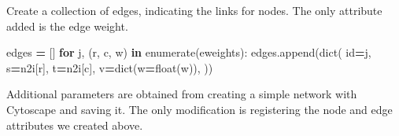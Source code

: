 \documentclass[
]{book}
\newenvironment{Shaded}{\begin{snugshade}}{\end{snugshade}}
\newcommand{\BuiltInTok}[1]{#1}
\newcommand{\ControlFlowTok}[1]{\textcolor[rgb]{0.13,0.29,0.53}{\textbf{#1}}}
\newcommand{\KeywordTok}[1]{\textcolor[rgb]{0.13,0.29,0.53}{\textbf{#1}}}
\newcommand{\NormalTok}[1]{#1}
\newcommand{\OperatorTok}[1]{\textcolor[rgb]{0.81,0.36,0.00}{\textbf{#1}}}
\begin{document}
Create a collection of edges, indicating the links for nodes. The only attribute added is the edge weight.

\begin{Shaded}
\begin{Highlighting}[numbers=left,,]
\NormalTok{edges }\OperatorTok{=}\NormalTok{ []}
\ControlFlowTok{for}\NormalTok{ j, (r, c, w) }\KeywordTok{in} \BuiltInTok{enumerate}\NormalTok{(eweights):}
\NormalTok{    edges.append(}\BuiltInTok{dict}\NormalTok{(}
        \BuiltInTok{id}\OperatorTok{=}\NormalTok{j, s}\OperatorTok{=}\NormalTok{n2i[r], t}\OperatorTok{=}\NormalTok{n2i[c],}
\NormalTok{        v}\OperatorTok{=}\BuiltInTok{dict}\NormalTok{(w}\OperatorTok{=}\BuiltInTok{float}\NormalTok{(w)),}
\NormalTok{    ))}
\end{Highlighting}
\end{Shaded}

Additional parameters are obtained from creating a simple network with Cytoscape and saving it.
The only modification is registering the node and edge attributes we created above.
\end{document}
